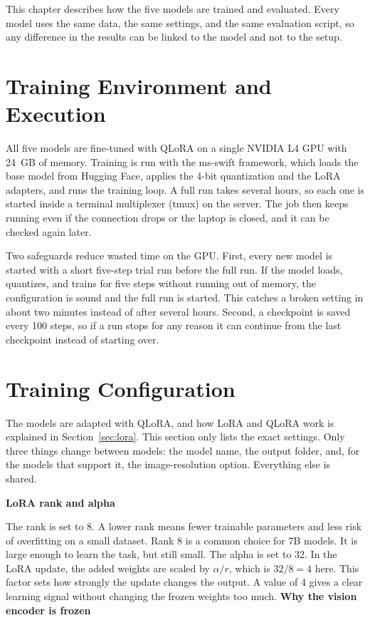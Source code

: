 \documentclass[a4paper,12pt]{report}
\newcommand{\minisection}[1]{%
  \vspace{1ex}
  \noindent\textbf{#1}\par
  \vspace{0.5ex}
}
\begin{document}
This chapter describes how the five models are trained and evaluated. Every model uses the same data, the same settings, and the same evaluation script, so any difference in the results can be linked to the model and not to the setup.

\section{Training Environment and Execution}

All five models are fine-tuned with QLoRA on a single NVIDIA L4 GPU with 24~GB of memory. Training is run with the ms-swift framework, which loads the base model from Hugging Face, applies the 4-bit quantization and the LoRA adapters, and runs the training loop. A full run takes several hours, so each one is started inside a terminal multiplexer (tmux) on the server. The job then keeps running even if the connection drops or the laptop is closed, and it can be checked again later.

Two safeguards reduce wasted time on the GPU. First, every new model is started with a short five-step trial run before the full run. If the model loads, quantizes, and trains for five steps without running out of memory, the configuration is sound and the full run is started. This catches a broken setting in about two minutes instead of after several hours. Second, a checkpoint is saved every 100 steps, so if a run stops for any reason it can continue from the last checkpoint instead of starting over.

\section{Training Configuration}

The models are adapted with QLoRA, and how LoRA and QLoRA work is explained in Section~\ref{sec:lora}. This section only lists the exact settings. Only three things change between models: the model name, the output folder, and, for the models that support it, the image-resolution option. Everything else is shared.

\minisection{LoRA rank and alpha}

The rank is set to 8. A lower rank means fewer trainable parameters and less risk of overfitting on a small dataset. Rank 8 is a common choice for 7B models. It is large enough to learn the task, but still small. The alpha is set to 32. In the LoRA update, the added weights are scaled by $\alpha / r$, which is $32 / 8 = 4$ here. This factor sets how strongly the update changes the output. A value of 4 gives a clear learning signal without changing the frozen weights too much.
\newpage
\minisection{Why the vision encoder is frozen}
\end{document}
